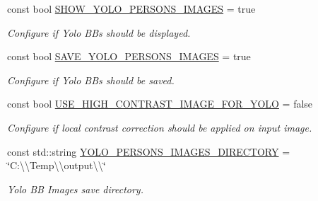 \begin{DoxyCompactItemize}
\mbox{\label{namespacedto_1_1_configuration_a0c9927d72de28d0059f4fc333a67500e}} 
const bool \mbox{\hyperlink{namespacedto_1_1_configuration_a0c9927d72de28d0059f4fc333a67500e}{S\+H\+O\+W\+\_\+\+Y\+O\+L\+O\+\_\+\+P\+E\+R\+S\+O\+N\+S\+\_\+\+I\+M\+A\+G\+ES}} = true
\begin{DoxyCompactList}\small\item\em Configure if Yolo B\+Bs should be displayed. \end{DoxyCompactList}\item 
\mbox{\label{namespacedto_1_1_configuration_aa1f3eeeb3d5a1edeab9b93ee35abceb4}} 
const bool \mbox{\hyperlink{namespacedto_1_1_configuration_aa1f3eeeb3d5a1edeab9b93ee35abceb4}{S\+A\+V\+E\+\_\+\+Y\+O\+L\+O\+\_\+\+P\+E\+R\+S\+O\+N\+S\+\_\+\+I\+M\+A\+G\+ES}} = true
\begin{DoxyCompactList}\small\item\em Configure if Yolo B\+Bs should be saved. \end{DoxyCompactList}\item 
\mbox{\label{namespacedto_1_1_configuration_a7d6e73c3f179b639d3d5f31cb9360a98}} 
const bool \mbox{\hyperlink{namespacedto_1_1_configuration_a7d6e73c3f179b639d3d5f31cb9360a98}{U\+S\+E\+\_\+\+H\+I\+G\+H\+\_\+\+C\+O\+N\+T\+R\+A\+S\+T\+\_\+\+I\+M\+A\+G\+E\+\_\+\+F\+O\+R\+\_\+\+Y\+O\+LO}} = false
\begin{DoxyCompactList}\small\item\em Configure if local contrast correction should be applied on input image. \end{DoxyCompactList}\item 
\mbox{\label{namespacedto_1_1_configuration_a7036a93e50296becc3c2c021e8b12f41}} 
const std\+::string \mbox{\hyperlink{namespacedto_1_1_configuration_a7036a93e50296becc3c2c021e8b12f41}{Y\+O\+L\+O\+\_\+\+P\+E\+R\+S\+O\+N\+S\+\_\+\+I\+M\+A\+G\+E\+S\+\_\+\+D\+I\+R\+E\+C\+T\+O\+RY}} = \char`\"{}C\+:\textbackslash{}\textbackslash{}\+Temp\textbackslash{}\textbackslash{}output\textbackslash{}\textbackslash{}\char`\"{}
\begin{DoxyCompactList}\small\item\em Yolo BB Images save directory. \end{DoxyCompactList}\item 

\end{DoxyCompactItemize}
